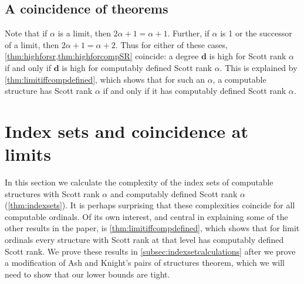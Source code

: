 \documentclass{amsart}
\newcommand\+[1]{\mathcal{#1}}
\renewcommand\*[1]{\mathbf{#1}}
\renewcommand\=[1]{\text{#1}}
\renewcommand\*[1]{\mathbf{#1}}
\begin{document}
\subsection{A coincidence of theorems}

Note that if $\alpha$ is a limit, then $2\alpha+1 = \alpha+1$.  Further, if $\alpha$ is 1 or the successor of a limit, then $2\alpha+1 = \alpha+2$.  Thus for either of these cases, \cref{thm:highforsr,thm:highforcompSR} coincide: a degree $\*d$ is high for Scott rank $\alpha$ if and only if $\*d$ is high for computably defined Scott rank $\alpha$.  This is explained by \cref{thm:limitiffcompdefined}, which shows that for such an $\alpha$, a computable structure has Scott rank $\alpha$ if and only if it has computably defined Scott rank $\alpha$.

\section{Index sets and coincidence at limits}\label{sec:index}
In this section we calculate the complexity of the index sets of computable structures with Scott rank $\alpha$ and computably defined Scott rank $\alpha$ (\cref{thm:indexsets}). It is perhaps surprising that these complexities coincide for all computable ordinals. Of its own interest, and central in explaining some of the other results in the paper, is \cref{thm:limitiffcompdefined}, which shows that for limit ordinals every structure with Scott rank at that level has computably defined Scott rank. We prove these results in \cref{subsec:indexsetcalculations} after we prove a modification of Ash and Knight's pairs of structures theorem, which we will need to show that our lower bounds are tight.
\end{document}
